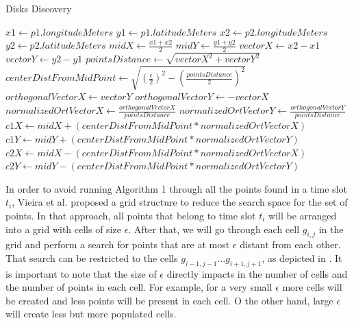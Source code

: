 \begin{algorithm}
\caption{Disks Discovery}
\begin{algorithmic}[1]
    \State $x1 \gets p1.longitudeMeters$
    \State $y1 \gets p1.latitudeMeters$
    \State $x2 \gets p2.longitudeMeters$
    \State $y2 \gets p2.latitudeMeters$
    \State
    \State $midX \gets \frac{x1 + x2}{2}$
    \State $midY \gets \frac{y1 + y2}{2}$
    \State
    \State $vectorX \gets x2 - x1$
    \State $vectorY \gets y2 - y1$
    \State
    \State $pointsDistance \gets \sqrt{vectorX^2 + vectorY^2}$
    \State $centerDistFromMidPoint \gets \sqrt{(\frac{\epsilon}{2})^2 - (\frac{pointsDistance}{2})^2}$
    \State
    \State $orthogonalVectorX \gets vectorY$
    \State $orthogonalVectorY \gets -vectorX$
    \State
    \State $normalizedOrtVectorX \gets \frac{orthogonalVectorX}{pointsDistance}$
    \State $normalizedOrtVectorY \gets \frac{orthogonalVectorY}{pointsDistance}$
    \State
    \State $c1X \gets midX + (centerDistFromMidPoint * normalizedOrtVectorX)$
    \State $c1Y \gets midY + (centerDistFromMidPoint * normalizedOrtVectorY)$
    \State
    \State $c2X \gets midX - (centerDistFromMidPoint * normalizedOrtVectorX)$
    \State $c2Y \gets midY - (centerDistFromMidPoint * normalizedOrtVectorY)$
\end{algorithmic}
\end{algorithm}

In order to avoid running Algorithm 1 through all the points found in a time slot $t_i$, Vieira et al. \citep{vieira}
proposed a grid structure to reduce the search space for the set of points. In that approach, all points that belong to
time slot $t_i$ will be arranged into a grid with cells of size $\epsilon$. After that, we will go through each cell
$g_{i,j}$ in the grid and perform a search for points that are at most $\epsilon$ distant from each other. That search
can be restricted to the cells $g_{i - 1, j - 1} ... g_{i + 1, j + 1}$, as depicted in . It is
important to note that the size of $\epsilon$ directly impacts in the number of cells and the number of points in each
cell. For example, for a very small $\epsilon$ more cells will be created and less points will be present in each cell.
O the other hand, large $\epsilon$ will create less but more populated cells.


